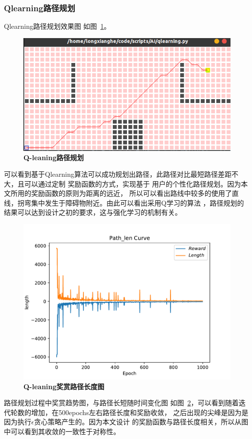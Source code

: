 \subsubsection{Qlearning路径规划}
Qlearning路径规划效果图
如图~\ref{fig:4-1}。
\begin{figure}[H]
  \centering
  \includegraphics[width=0.8\linewidth]{fig/qlearning.png}
  \caption{\textbf{Q-leaning路径规划}}
  \label{fig:4-1}
\end{figure}
可以看到基于Qlearning算法可以成功规划出路径，此路径对比最短路径差距不大，且可以通过定制
奖励函数的方式，实现基于 用户的个性化路径规划。因为本文所用的奖励函数的原则为距离的远近，
所以可以看出路线中较多的使用了直线，拐弯集中发生于障碍物附近。由此可以看出采用Q学习的算法
，路径规划的结果可以达到设计之初的要求，这与强化学习的机制有关。
\begin{figure}[H]
  \centering
  \includegraphics[width=0.5\linewidth]{fig/q_path_length.pdf}
  \caption{\textbf{Q-leaning奖赏路径长度图}}
  \label{fig:4-2}
\end{figure}
路径规划过程中奖赏趋势图，与路径长短随时间变化图
如图~\ref{fig:4-2}，可以看到随着迭代轮数的增加，在500epochs左右路径长度和奖励收敛，
之后出现的尖峰是因为是因为执行$\epsilon$贪心策略产生的。因为本文设计
的奖励函数与路径长度相关，所以从图中可以看到其收敛的一致性于对称性。
